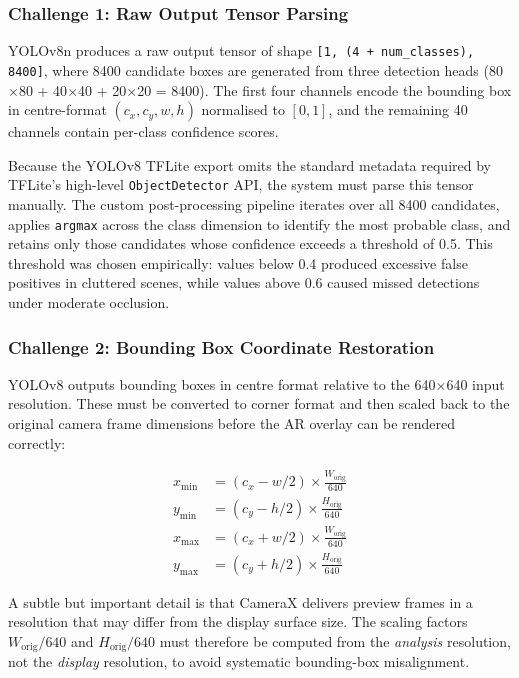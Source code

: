 \documentclass[a4paper, 12pt]{article}
\begin{document}
    \subsubsection{Challenge 1: Raw Output Tensor Parsing}

    YOLOv8n produces a raw output tensor of shape \texttt{[1, (4 + num\_classes), 8400]}, where 8400 candidate boxes are generated from three detection heads (80$\times$80 + 40$\times$40 + 20$\times$20 = 8400). The first four channels encode the bounding box in centre-format $(c_x, c_y, w, h)$ normalised to $[0,1]$, and the remaining 40 channels contain per-class confidence scores.

    Because the YOLOv8 TFLite export omits the standard metadata required by TFLite's high-level \texttt{ObjectDetector} API, the system must parse this tensor manually. The custom post-processing pipeline iterates over all 8400 candidates, applies \texttt{argmax} across the class dimension to identify the most probable class, and retains only those candidates whose confidence exceeds a threshold of 0.5. This threshold was chosen empirically: values below 0.4 produced excessive false positives in cluttered scenes, while values above 0.6 caused missed detections under moderate occlusion.

    \subsubsection{Challenge 2: Bounding Box Coordinate Restoration}

    YOLOv8 outputs bounding boxes in centre format relative to the 640$\times$640 input resolution. These must be converted to corner format and then scaled back to the original camera frame dimensions before the AR overlay can be rendered correctly:

    \begin{align}
        x_{\min} &= (c_x - w/2) \times \frac{W_{\text{orig}}}{640} \\
        y_{\min} &= (c_y - h/2) \times \frac{H_{\text{orig}}}{640} \\
        x_{\max} &= (c_x + w/2) \times \frac{W_{\text{orig}}}{640} \\
        y_{\max} &= (c_y + h/2) \times \frac{H_{\text{orig}}}{640}
    \end{align}

    A subtle but important detail is that CameraX delivers preview frames in a resolution that may differ from the display surface size. The scaling factors $W_{\text{orig}}/640$ and $H_{\text{orig}}/640$ must therefore be computed from the \emph{analysis} resolution, not the \emph{display} resolution, to avoid systematic bounding-box misalignment.
\end{document}
